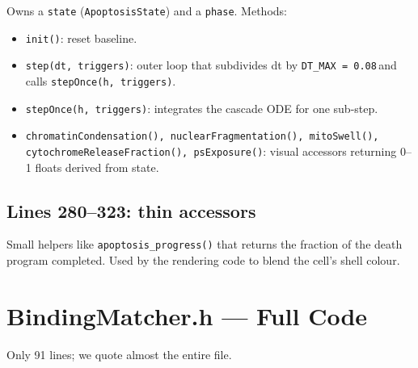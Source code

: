 \documentclass[11pt,letterpaper,twoside,openany]{book}
\newcommand{\code}[1]{\texttt{#1}}
\newcommand{\biosec}{\text{bio-s}}
\begin{document}
Owns a \code{state} (\code{ApoptosisState}) and a \code{phase}.
Methods:
\begin{itemize}
  \item \code{init()}: reset baseline.
  \item \code{step(dt, triggers)}: outer loop that subdivides dt
        by \code{DT\_MAX = 0.08}\,\biosec and calls
        \code{stepOnce(h, triggers)}.
  \item \code{stepOnce(h, triggers)}: integrates the cascade ODE
        for one sub-step.
  \item \code{chromatinCondensation(), nuclearFragmentation(),
        mitoSwell(), cytochromeReleaseFraction(), psExposure()}:
        visual accessors returning 0--1 floats derived from state.
\end{itemize}

\section{Lines 280--323: thin accessors}

Small helpers like \code{apoptosis\_progress()} that returns the
fraction of the death program completed. Used by the rendering
code to blend the cell's shell colour.

\chapter{BindingMatcher.h --- Full Code}
\label{ch:bmatcher-line}

Only 91 lines; we quote almost the entire file.
\end{document}
